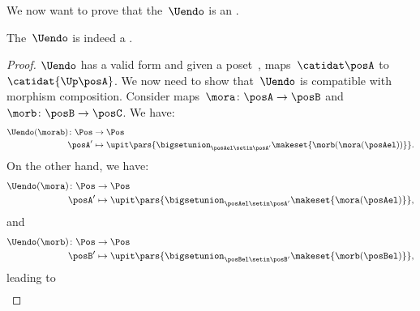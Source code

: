 We now want to prove that the~$\Uendo$  is an .

\begin{lemma}
    \label{lem:Uendo-is-functor}
    The~$\Uendo$  is indeed a .
\end{lemma}

\begin{proof}
    $\Uendo$ has a valid form and given a poset~\posA, maps~$\catidat\posA$ to~$\catidat{\Up \posA}$.
    We now need to show that~$\Uendo$ is compatible with morphism composition.
    Consider maps~$\mora\colon \posA \to \posB$ and~$\morb\colon \posB \to \posC$.
    We have:
    \begin{equation}
        \label{eq:ufunctor_1}
        \begin{aligned}
            \Uendo(\morab)\colon \Pos & \to \Pos \\
            \posA'                    & \mapsto \upit \pars{ \bigsetunion_{\posAel\setin \posA'} \makeset{\morb(\mora(\posAel))}}.
        \end{aligned}
    \end{equation}
    On the other hand, we have:
    \begin{equation}
        \begin{aligned}
            \Uendo(\mora)\colon \Pos & \to \Pos \\
            \posA'                   & \mapsto \upit \pars{ \bigsetunion_{\posAel\setin \posA'}\makeset{\mora(\posAel)}},
        \end{aligned}
    \end{equation}
    and
    \begin{equation}
        \begin{aligned}
            \Uendo(\morb)\colon \Pos & \to \Pos \\
            \posB'                   & \mapsto \upit \pars{ \bigsetunion_{\posBel\setin \posB'}\makeset{\morb(\posBel)}},
        \end{aligned}
    \end{equation}
    leading to
    \begin{equation}
        \label{eq:ufunctor_2}
        \begin{aligned}

\end{aligned}
\end{equation}
\end{proof}
